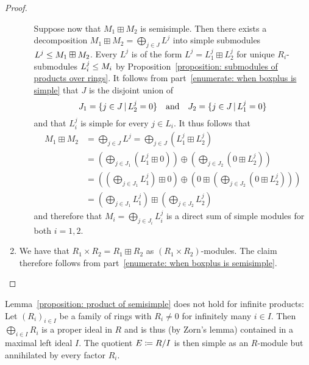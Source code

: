 \begin{proof}
\begin{enumerate}
\begin{itemize}
          Suppose now that $M_1 \boxplus M_2$ is semisimple.
          Then there exists a decomposition $M_1 \boxplus M_2 = \bigoplus_{j \in J} L^j$ into simple submodules $L^j \leq M_1 \boxplus M_2$.
          Every $L^j$ is of the form $L^j = L^j_1 \boxplus L^j_2$ for unique $R_i$-submodules $L^j_i \leq M_i$ by Proposition~\ref{proposition: submodules of products over rings}.
          It follows from part~\ref*{enumerate: when boxplus is simple} that $J$ is the disjoint union of
          \[
              J_1
            = \{ j \in J \suchthat L^j_2 = 0 \}
            \quad\text{and}\quad
              J_2
            = \{ j \in J \suchthat L^j_1 = 0 \}
          \]
          and that $L^j_i$ is simple for every $j \in L_i$.
          It thus follows that
          \begingroup
          \allowdisplaybreaks
          \begin{align*}
                M_1 \boxplus M_2
            &=  \bigoplus_{j \in J} L^j
            =   \bigoplus_{j \in J} ( L^j_1 \boxplus  L^j_2 )
            \\
            &=  \left(
                  \bigoplus_{j \in J_1} ( L^j_1 \boxplus 0 )
                \right)
                \oplus
                \left(
                  \bigoplus_{j \in J_2} ( 0 \boxplus  L^j_2 )
                \right)
            \\
            &=  \left(
                  \left( \bigoplus_{j \in J_1} L^j_1 \right) \boxplus 0
                \right)
                \oplus
                \left(
                  0 \boxplus \left( \bigoplus_{j \in J_2} ( 0 \boxplus  L^j_2 ) \right)
                \right)
            \\
            &=  \left( \bigoplus_{j \in J_1} L^j_1 \right)
                \boxplus
                \left( \bigoplus_{j \in J_2} L^j_2 \right)
          \end{align*}
          \endgroup
          and therefore that $M_i = \bigoplus_{j \in J_i} L^j_i$ is a direct sum of simple modules for both $i = 1,2$.
      \end{itemize}
    \item
      We have that $R_1 \times R_2 = R_1 \boxplus R_2$ as $(R_1 \times R_2)$-modules.
      The claim therefore follows from part~\ref*{enumerate: when boxplus is semisimple}.
    \qedhere
  \end{enumerate}
\end{proof}


\begin{warning}
  Lemma~\ref{proposition: product of semisimple} does not hold for infinite products:
  Let $(R_i)_{i \in I}$ be a family of rings with $R_i \neq 0$ for infinitely many $i \in I$.
  Then $\bigoplus_{i \in I} R_i$ is a proper ideal in $R$ and is thus (by Zorn’s lemma) contained in a maximal left ideal $I$.
  The quotient $E \coloneqq R/I$ is then simple as an $R$-module but annihilated by every factor $R_i$.
\end{warning}


